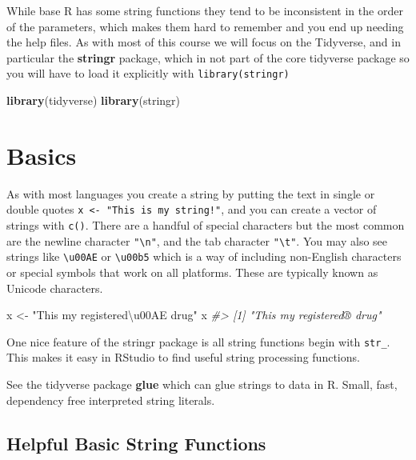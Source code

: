 \documentclass[]{book}
\newenvironment{Shaded}{\begin{snugshade}}{\end{snugshade}}
\newcommand{\KeywordTok}[1]{\textcolor[rgb]{0.13,0.29,0.53}{\textbf{#1}}}
\newcommand{\StringTok}[1]{\textcolor[rgb]{0.31,0.60,0.02}{#1}}
\newcommand{\CommentTok}[1]{\textcolor[rgb]{0.56,0.35,0.01}{\textit{#1}}}
\newcommand{\NormalTok}[1]{#1}
\theoremstyle{definition}
\theoremstyle{definition}
\theoremstyle{definition}
\theoremstyle{remark}
\let\BeginKnitrBlock\begin \let\EndKnitrBlock\end
\begin{document}
While base R has some string functions they tend to be inconsistent in
the order of the parameters, which makes them hard to remember and you
end up needing the help files. As with most of this course we will focus
on the Tidyverse, and in particular the \textbf{stringr} package, which
in not part of the core tidyverse package so you will have to load it
explicitly with \texttt{library(stringr)}

\begin{Shaded}
\begin{Highlighting}[]
\KeywordTok{library}\NormalTok{(tidyverse)}
\KeywordTok{library}\NormalTok{(stringr)}
\end{Highlighting}
\end{Shaded}

\section{Basics}\label{basics}

As with most languages you create a string by putting the text in single
or double quotes \texttt{x\ \textless{}-\ "This\ is\ my\ string!"}, and
you can create a vector of strings with \texttt{c()}. There are a
handful of special characters but the most common are the newline
character \texttt{"\textbackslash{}n"}, and the tab character
\texttt{"\textbackslash{}t"}. You may also see strings like
\texttt{\textbackslash{}u00AE} or \texttt{\textbackslash{}u00b5} which
is a way of including non-English characters or special symbols that
work on all platforms. These are typically known as Unicode characters.

\begin{Shaded}
\begin{Highlighting}[]
\NormalTok{x <-}\StringTok{ "This my registered\textbackslash{}u00AE drug"}
\NormalTok{x}
\CommentTok{#> [1] "This my registered® drug"}
\end{Highlighting}
\end{Shaded}

One nice feature of the stringr package is all string functions begin
with \texttt{str\_}. This makes it easy in RStudio to find useful string
processing functions.

\BeginKnitrBlock{rmdtip}
See the tidyverse package \textbf{glue} which can glue strings to data
in R. Small, fast, dependency free interpreted string literals.
\EndKnitrBlock{rmdtip}

\subsection{Helpful Basic String
Functions}\label{helpful-basic-string-functions}
\end{document}
